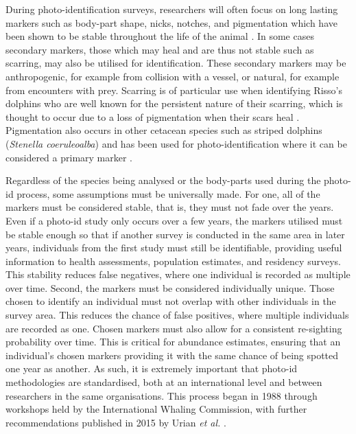 During photo-identification surveys, researchers will often focus on long lasting markers such as body-part shape, nicks, notches, and pigmentation which have been shown to be stable throughout the life of the animal \cite{wursig_photographic_1977, lockyer_observations_1990, mann_cetacean_2000}. In some cases secondary markers, those which may heal and are thus not stable such as scarring, may also be utilised for identification. These secondary markers may be anthropogenic, for example from collision with a vessel, or natural, for example from encounters with prey. Scarring is of particular use when identifying Risso's dolphins who are well known for the persistent nature of their scarring, which is thought to occur due to a loss of pigmentation when their scars heal \cite{mariani_analysis_2016}. Pigmentation also occurs in other cetacean species such as striped dolphins (\textit{Stenella coeruleoalba}) and has been used for photo-identification where it can be considered a primary marker \cite{rosso_colour_2008}.

Regardless of the species being analysed or the body-parts used during the photo-id process, some assumptions must be universally made. For one, all of the markers must be considered stable, that is, they must not fade over the years. Even if a photo-id study only occurs over a few years, the markers utilised must be stable enough so that if another survey is conducted in the same area in later years, individuals from the first study must still be identifiable, providing useful information to health assessments, population estimates, and residency surveys. This stability reduces false negatives, where one individual is recorded as multiple over time. Second, the markers must be considered individually unique. Those chosen to identify an individual must not overlap with other individuals in the survey area. This reduces the chance of false positives, where multiple individuals are recorded as one. Chosen markers must also allow for a consistent re-sighting probability over time. This is critical for abundance estimates,  ensuring that an individual's chosen markers providing it with the same chance of being spotted one year as another. As such, it is extremely important that photo-id methodologies are standardised, both at an international level and between researchers in the same organisations. This process began in 1988 through workshops held by the International Whaling Commission, with further recommendations published in 2015 by Urian \textit{et al.} \cite{hammond_individual_1990, urian_recommendations_2015}.

